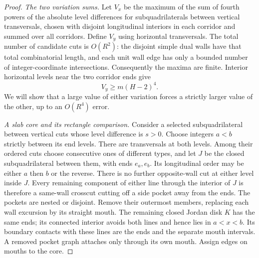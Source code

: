 \begin{proof}
\smallskip\noindent
\emph{The two variation sums.}
Let $V_x$ be the maximum of the sum of fourth powers of the absolute
level differences for subquadrilaterals between vertical transversals,
chosen with disjoint longitudinal interiors in each corridor and summed
over all corridors.  Define $V_y$ using horizontal transversals.
The total number of candidate cuts is $O(R^2)$: the disjoint simple
dual walls have that total combinatorial length, and each unit wall edge
has only a bounded number of integer-coordinate intersections.
Consequently the maxima are finite.  Interior horizontal levels near
the two corridor ends give
\begin{equation}
 V_y\ge m(H-2)^4.
 \label{rect:initial-variation}
\end{equation}
We will show that a large value of either variation forces a strictly
larger value of the other, up to an $O(R^4)$ error.

\smallskip\noindent
\emph{A slab core and its rectangle comparison.}
Consider a selected subquadrilateral between vertical cuts whose level
difference is $s>0$.  Choose integers $a<b$ strictly between its end
levels.  There are transversals at both levels.  Among their ordered
cuts choose consecutive ones of different types, and let $J$ be the
closed subquadrilateral between them, with ends $e_a,e_b$.  Its
longitudinal order may be either $a$ then $b$ or the reverse.  There is
no further opposite-wall cut at either level inside $J$.  Every
remaining component of either line through the interior of $J$ is
therefore a same-wall crosscut cutting off a side pocket away from the
ends.  The pockets are nested or disjoint.  Remove their outermost
members, replacing each wall excursion by its straight mouth.  The
remaining closed Jordan disk $K$ has the same ends; its connected
interior avoids both lines and hence lies in $a<x<b$.  Its boundary
contacts with these lines are the ends and the separate mouth intervals.
A removed pocket graph attaches only through its own mouth.  Assign
edges on mouths to the core.


\end{proof}
